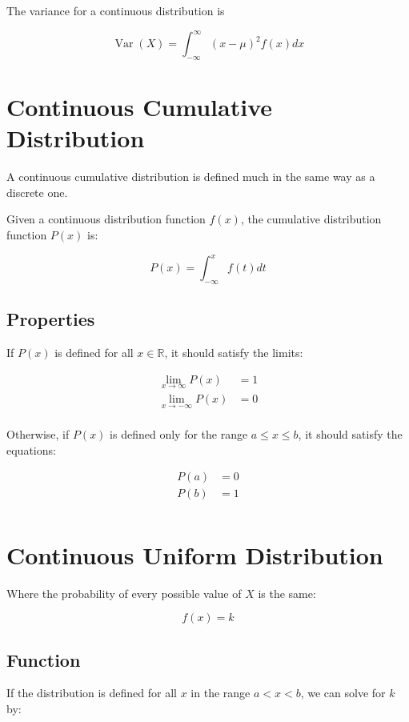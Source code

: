 \documentclass[a4paper,11pt]{article}
\DeclareMathOperator\Var{Var}
\begin{document}
The variance for a continuous distribution is

$$
\Var(X) = \int_{-\infty}^{\infty} (x - \mu)^2 f(x) dx
$$




\section{Continuous Cumulative Distribution}

A continuous cumulative distribution is defined much in the same way as a
discrete one.

Given a continuous distribution function $f(x)$, the cumulative distribution
function $P(x)$ is:

$$
P(x) = \int_{-\infty}^x f(t) dt
$$


\subsection{Properties}

If $P(x)$ is defined for all $x \in \mathbb{R}$, it should satisfy the limits:

$$
\begin{aligned}
\lim_{x \to \infty} P(x) & = 1 \\
\lim_{x \to -\infty} P(x) & = 0 \\
\end{aligned}
$$

Otherwise, if $P(x)$ is defined only for the range $a \leq x \leq b$, it should
satisfy the equations:

$$
\begin{aligned}
P(a) & = 0 \\
P(b) & = 1 \\
\end{aligned}
$$




\section{Continuous Uniform Distribution}

Where the probability of every possible value of $X$ is the same:

$$
f(x) = k
$$


\subsection{Function}

If the distribution is defined for all $x$ in the range $a < x < b$, we can
solve for $k$ by:
\end{document}
